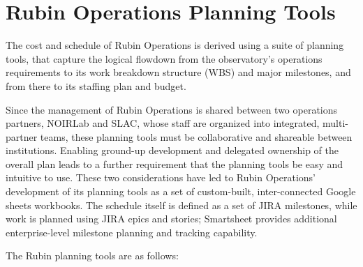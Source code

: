 \section{Rubin Operations Planning Tools}
\label{sec:planning-tools}

The cost and schedule of Rubin Operations is derived using a suite of planning tools, that capture the logical flowdown from the observatory's operations requirements to its work breakdown structure (WBS) and major milestones, and from there to its staffing plan and budget.

Since the management of Rubin Operations is shared between two operations partners, NOIRLab and SLAC, whose staff are organized into integrated, multi-partner teams, these planning tools must be collaborative and shareable between institutions.
Enabling ground-up development and delegated ownership of the overall plan leads to a further requirement that the planning tools be easy and intuitive to use.
These two considerations have led to Rubin Operations' development of its planning tools as a set of custom-built, inter-connected Google sheets workbooks.
The schedule itself is defined as a set of JIRA milestones, while work is planned using JIRA epics and stories; Smartsheet provides additional enterprise-level milestone planning and tracking capability.

The Rubin planning tools are as follows:

